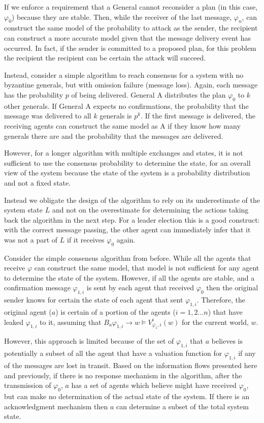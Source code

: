 If we enforce a requirement that a General cannot reconsider a plan (in this case, $\varphi_0$) because they are stable. Then, while the receiver of the last message, $\varphi_n$, can construct the same model of the probability to attack as the sender, the recipient can construct a more accurate model given that the message delivery event has occurred. In fact, if the sender is committed to a proposed plan, for this problem the recipient the recipient can be certain the attack will succeed.

Instead, consider a simple algorithm to reach consensus for a system with no byzantine generals, but with omission failure (message loss). Again, each message has the probability $p$ of being delivered. General A distributes the plan $\varphi_0$ to $k$ other generals. If General A expects no confirmations, the probability that the message was delivered to all $k$ generals is $p^k$. If the first message is delivered, the receiving agents can construct the same model as A if they know how many generals there are and the probability that the messages are delivered.

However, for a longer algorithm with multiple exchanges and states, it is not sufficient to use the consensus probability to determine the state, for an overall view of the system because the state of the system is a probability distribution and not a fixed state.

Instead we obligate the design of the algorithm to rely on its underestimate of the system state $L$ and not on the overestimate for determining the actions taking back the algorithm in the next step. For a leader election this is a good construct: with the correct message passing, the other agent can immediately infer that it was not a part of $L$ if it receives $\varphi_0$ again. 

Consider the simple consensus algorithm from before. While all the agents that receive $\varphi$ can construct the same model, that model is not sufficient for any agent to determine the state of the system. However, if all the agents are stable, and a confirmation message $\varphi_{1,i}$ is sent by each agent that received $\varphi_0$ then the original sender knows for certain the state of each agent that sent $\varphi_{1,i}$. Therefore, the original agent ($a$) is certain of a portion of the agents ($i=1,2...n$) that have leaked $\varphi_{1,i}$ to it, assuming that $B_a \varphi_{1,i} \rightarrow w \vDash V_{\varphi_1,i}^i(w)$ for the current world, $w$.

However, this approach is limited because of the set of $\varphi_{1,i}$ that $a$ believes is potentially a subset of all the agent that have a valuation function for $\varphi_{1,i}$ if any of the messages are lost in transit. Based on the information flows presented here and previously, if there is no response mechanism in the algorithm, after the transmission of $\varphi_0$, $a$ has a set of agents which believe might have received $\varphi_0$, but can make no determination of the actual state of the system. If there is an acknowledgment mechanism then $a$ can determine a subset of the total system state. 

